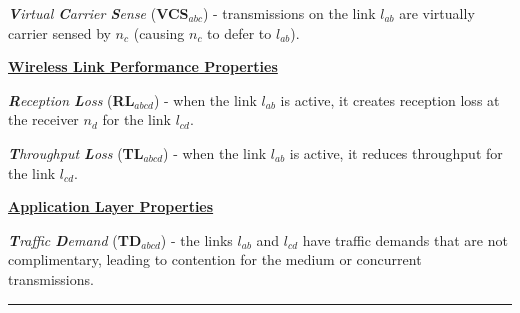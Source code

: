 	\item \emph{\textbf{V}irtual \textbf{C}arrier \textbf{S}ense} (\textbf{VCS}$_{abc}$) - transmissions on the link $l_{ab}$ are virtually carrier sensed by $n_c$ (causing $n_c$ to defer to $l_{ab}$).
	
\squishend

\smallskip
\noindent \underline{\textbf{Wireless Link Performance Properties}}
\squishlist

	\item \emph{\textbf{R}eception \textbf{L}oss} (\textbf{RL}$_{abcd}$) - when the link $l_{ab}$ is active, it creates reception loss at the receiver $n_d$ for the link $l_{cd}$.
	
	\item \emph{\textbf{T}hroughput \textbf{L}oss} (\textbf{TL}$_{abcd}$) - when the link $l_{ab}$ is active, it reduces throughput for the link $l_{cd}$. 

\squishend

\smallskip
\noindent \underline{\textbf{Application Layer Properties}}
\squishlist

	\item \emph{\textbf{T}raffic \textbf{D}emand} (\textbf{TD}$_{abcd}$) - the links $l_{ab}$ and $l_{cd}$ have traffic demands that are not complimentary, leading to contention for the medium or concurrent transmissions.
	
\squishend
\bigskip
\hrule
\bigskip
